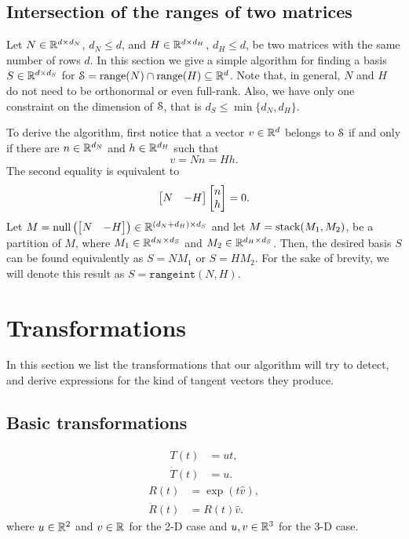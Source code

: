 \documentclass[12pt]{article}
\DeclareMathOperator{\nullspace}{null}
\DeclareMathOperator{\rangespace}{range}
\newcommand{\rangeint}{\texttt{rangeint}}
\begin{document}
\subsection{Intersection of the ranges of two matrices}
\label{sec:intersection-ranges}


Let $N\in\mathbb{R}^{d\times d_N}{}$, $d_N\leq d$, and $H\in\mathbb{R}^{d\times d_H}{}$, $d_H\leq d$, be two matrices with the same number of rows $d$. In this section we give a simple algorithm for finding a basis $S\in\mathbb{R}^{d\times d_S}{}$ for $\Sset=\rangespace(N)\cap\rangespace(H)\subseteq \real{d}$. Note that, in general, $N$ and $H$ do not need to be orthonormal or even full-rank. Also, we have only one constraint on the dimension of $\mathcal{S}$, that is $d_S\leq\min\{d_N,d_H\}$.

To derive the algorithm, first notice that a vector $v\in\mathbb{R}^{d}{}$ belongs to $\mathcal{S}$ if and only if there are $n\in\mathbb{R}^{d_N}{}$ and $h\in\mathbb{R}^{d_H}{}$ such that
\begin{equation}
v=Nn=Hh.
\end{equation}
The second equality is equivalent to
\begin{equation}
  \begin{bmatrix}N & -H\end{bmatrix}\begin{bmatrix}n\\h\end{bmatrix}=0.  
\end{equation}
Let $M=\nullspace\left(\bmat{N & -H}\right)\in\real{(d_N+d_H)\times d_S}$ and let $M=\operatorname{stack}(M_1,M_2)$, be a partition of $M$, where $M_1\in\mathbb{R}^{d_N\times d_S}{}$ and $M_2\in\mathbb{R}^{d_H\times d_S}{}$. Then, the desired basis $S$ can be found equivalently as $S=NM_1$ or $S=HM_2$. For the sake of brevity, we will denote this result as $S=\rangeint(N,H)$.

\section{Transformations}
In this section we list the transformations that our algorithm will try to detect, and derive expressions for the kind of tangent vectors they produce.

\subsection{Basic transformations}
\begin{align}
  T(t)&=ut,\\
  \dot{T}(t)&=u.  
\end{align}
\begin{align}
  R(t)&=\exp(t\hat{v}),\\
  \dot{R}(t)&= R(t)\hat{v}.  
\end{align}
where $u\in\mathbb{R}^{2}{}$ and $v\in\mathbb{R}^{}{}$ for the 2-D case and $u,v\in\mathbb{R}^{3}{}$ for the 3-D case.
\end{document}
